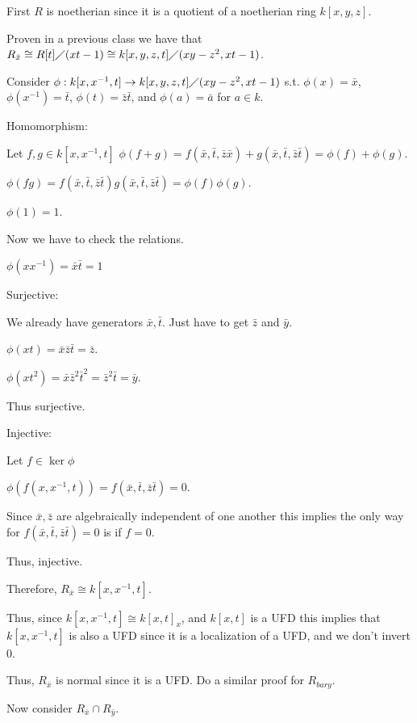 \documentclass[12pt, letterpaper]{article}
\begin{document}
\begin{problemproof}
    First $R$ is noetherian since it is a quotient of a noetherian ring $k[x,y,z]$.

    Proven in a previous class 
    we have that 
    $R_{\bar{x}} \cong R[t] \diagup (xt-1) \cong k[x,y,z,t] \diagup (xy-z^2,xt-1)$.

    Consider $\phi : k[x,x^{-1},t] \to k[x,y,z,t] \diagup (xy-z^2,xt-1)$ s.t. $\phi(x)=\bar{x}$, $\phi(x^{-1}) = \bar{t}$, $\phi(t)=\bar{z}\bar{t}$, and $\phi(a)=\bar{a}$ for $a \in k$.
    
    Homomorphism:

    Let $f,g \in k[x,x^{-1},t]$
    $\phi(f+g)=f(\bar{x},\bar{t},\bar{z}\bar{x})+g(\bar{x},\bar{t},\bar{z}\bar{t})=\phi(f)+\phi(g)$.

    $\phi(fg)=f(\bar{x},\bar{t},\bar{z}\bar{t})g(\bar{x},\bar{t},\bar{z}\bar{t})=\phi(f)\phi(g)$.

    $\phi(1)=1$.

    Now we have to check the relations.

    $\phi(xx^{-1})=\bar{x}\bar{t}=1$

    Surjective:

    We already have generators $\bar{x},\bar{t}$. Just have to get $\bar{z}$ and $\bar{y}$.

    $\phi(xt)=\bar{x}\bar{z}\bar{t}=\bar{z}$.

    $\phi(xt^2)=\bar{x}\bar{z}^2\bar{t}^2=\bar{z}^2\bar{t}=\bar{y}$.

    Thus surjective.

    Injective:

    Let $f \in \ker{\phi}$

    $\phi(f(x,x^{-1},t))=f(\bar{x},\bar{t},\bar{z}\bar{t})=0$.

    Since $\bar{x},\bar{z}$ are algebraically independent of one another this implies the only way for $f(\bar{x},\bar{t},\bar{z}\bar{t})=0$ is if $f=0$.

    Thus, injective.

    Therefore, $R_{\bar{x}} \cong k[x,x^{-1},t]$.

    Thus, since $k[x,x^{-1},t] \cong k[x,t]_{x}$, and $k[x,t]$ is a UFD this implies that $k[x,x^{-1},t]$ is also a UFD since it is a localization of a UFD, and we don't invert 0.

    Thus, $R_{\bar{x}}$ is normal since it is a UFD. Do a similar proof for $R_{bar{y}}$.

    Now consider $R_{\bar{x}} \cap R_{\bar{y}}$.
 

\end{problemproof}
\end{document}
